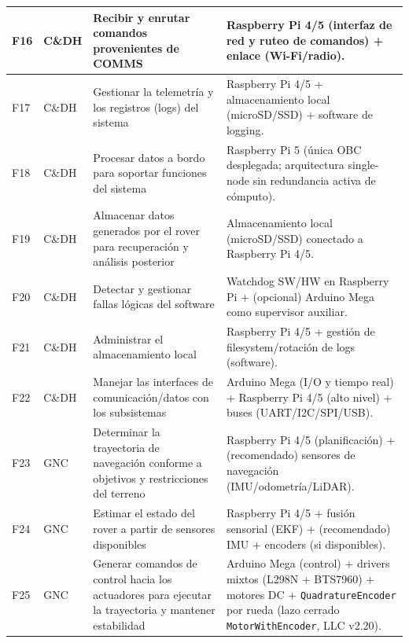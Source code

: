 \begin{landscape}
\begin{longtable}{|p{0.9cm}|p{2.0cm}|p{6.8cm}|p{9.2cm}|}
F16 & C\&DH & Recibir y enrutar comandos provenientes de COMMS &
Raspberry Pi 4/5 (interfaz de red y ruteo de comandos) + enlace (Wi-Fi/radio).\\ \hline

F17 & C\&DH & Gestionar la telemetría y los registros (logs) del sistema &
Raspberry Pi 4/5 + almacenamiento local (microSD/SSD) + software de logging.\\ \hline

F18 & C\&DH & Procesar datos a bordo para soportar funciones del sistema &
Raspberry Pi 5 (única OBC desplegada; arquitectura single-node sin redundancia activa de cómputo).\\ \hline

F19 & C\&DH & Almacenar datos generados por el rover para recuperación y análisis posterior &
Almacenamiento local (microSD/SSD) conectado a Raspberry Pi 4/5.\\ \hline

F20 & C\&DH & Detectar y gestionar fallas lógicas del software &
Watchdog SW/HW en Raspberry Pi + (opcional) Arduino Mega como supervisor auxiliar.\\ \hline

F21 & C\&DH & Administrar el almacenamiento local &
Raspberry Pi 4/5 + gestión de filesystem/rotación de logs (software).\\ \hline

F22 & C\&DH & Manejar las interfaces de comunicación/datos con los subsistemas &
Arduino Mega (I/O y tiempo real) + Raspberry Pi 4/5 (alto nivel) + buses (UART/I2C/SPI/USB).\\ \hline

F23 & GNC & Determinar la trayectoria de navegación conforme a objetivos y restricciones del terreno &
Raspberry Pi 4/5 (planificación) + (recomendado) sensores de navegación (IMU/odometría/LiDAR).\\ \hline

F24 & GNC & Estimar el estado del rover a partir de sensores disponibles &
Raspberry Pi 4/5 + fusión sensorial (EKF) + (recomendado) IMU + encoders (si disponibles).\\ \hline

F25 & GNC & Generar comandos de control hacia los actuadores para ejecutar la trayectoria y mantener estabilidad &
Arduino Mega (control) + drivers mixtos (L298N + BTS7960) + motores DC + \texttt{QuadratureEncoder} por rueda (lazo cerrado \texttt{MotorWithEncoder}, LLC v2.20).\\ \hline


\end{longtable}
\end{landscape}
